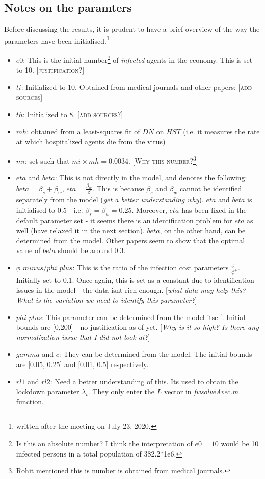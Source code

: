 \documentclass{../cls/NotesV2_Class}
\begin{document}
\subsection{Notes on the paramters}
Before discussing the results, it is prudent to have a brief overview of the way the parameters have been initialised.\footnote{written after the meeting on July 23, 2020.}
\begin{itemize}
	\item $e0$: This is the initial number\footnote{Is this an absolute number? I think the interpretation of $e0=10$ would be 10 infected persons in a total population of 382.2*1e6.} of \textit{infected} agents in the economy. This is set to 10. [\textsc{justification}?]
	\item $ti$: Initialized to 10. Obtained from medical journals and other papers: [\textsc{add sources}]
	\item $th$: Initialized to 8. [\textsc{add sources}?]
	\item $mh$: obtained from a least-squares fit of $DN$ on $HST$ (i.e. it measures the rate at which hospitalized agents die from the virus)
	\item $mi$: set such that $mi\times mh = 0.0034$. [\textsc{Why this number?}\footnote{Rohit mentioned this is number is obtained from medical journals.}]
	\item $eta$ and $beta$: This is not directly in the model, and denotes the following: $beta = \beta_s+\beta_w$, $eta = \frac{\beta_w}{\beta}$. This is because $\beta_s$ and $\beta_w$ cannot be identified separately from the model (\textit{get a better understanding why}). $eta$ and $beta$ is initialised to 0.5 - i.e. $\beta_s = \beta_w =0.25$. Moreover, $eta$ has been fixed in the default parameter set - it seems there is an identification problem for $eta$ as well (have relaxed it in the next section). $beta$, on the other hand, can be determined from the model. Other papers seem to show that the optimal value of $beta$ should be around 0.3.
	\item $\phi\_minus/phi\_plus$: This is the ratio of the infection cost parameters $\frac{\phi^-}{\phi^+}$. Initially set to 0.1. Once again, this is set as a constant due to identification issues in the model - the data isnt rich enough. [\textit{what data may help this? What is the variation we need to identify this parameter?}]
	\item $phi\_plus$: This parameter can be determined from the model itself. Initial bounds are [0,200] - no justification as of yet. [\textit{Why is it so high? Is there any normalization issue that I did not look at?}]
	\item $gamma$ and $c$: They can be determined from the model. The initial bounds are [0.05, 0.25] and [0.01, 0.5] respectively.
	\item $rl1$ and $rl2$: Need a better understanding of this. Its used to obtain the lockdown parameter $\lambda_t$. They only enter the $L$ vector in \textit{fwsolveAvec.m} function.
\end{itemize}
\end{document}
